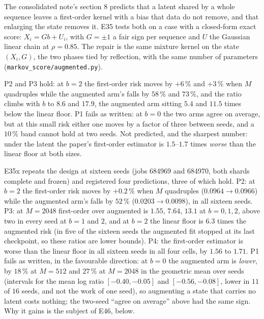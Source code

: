 \documentclass[10pt,a4paper]{article}
\newcommand{\code}[1]{\texttt{\small #1}}
\theoremstyle{plain}
\theoremstyle{remark}
\begin{document}
The consolidated note's section 8 predicts that a latent shared by a whole sequence leaves a first-order
kernel with a bias that data do not remove, and that enlarging the state removes it. E35 tests both on a
case with a closed-form exact score: $X_i=Gb+U_i$, with $G=\pm1$ a fair sign per sequence and $U$ the
Gaussian linear chain at $\rho=0.85$. The repair is the same mixture kernel on the state $(X_i,G)$, the two
phases tied by reflection, with the same number of parameters (\code{markov\_score/augmented.py}).

\begin{table}[h]\centering\footnotesize
\caption{E35, score risk against the closed-form exact score (seed 0 / seed 1). The linear floor is the
LMMSE of the true covariance $b^2\mathbf 1\mathbf 1^\top+\Sigma_U$; at $b=0$ it is the exact score.}
\label{tab:conf-e35}

\end{table}

P2 and P3 hold: at $b=2$ the first-order risk moves by $+6\,\%$ and $+3\,\%$ when $M$ quadruples while
the augmented arm's falls by $58\,\%$ and $73\,\%$, and the ratio climbs with $b$ to $8.6$ and $17.9$,
the augmented arm sitting $5.4$ and $11.5$ times below the linear floor. P1 fails as written: at $b=0$ the
two arms agree on average, but at this small risk either one moves by a factor of three between seeds, and
a $10\,\%$ band cannot hold at two seeds. Not predicted, and the sharpest number: under the latent the
paper's first-order estimator is $1.5$--$1.7$ times \emph{worse} than the linear floor at both sizes.

E35x repeats the design at sixteen seeds (jobs 684969 and 684970, both shards complete and frozen) and registered
four predictions, three of which hold. P2: at $b=2$ the first-order risk moves by $+0.2\,\%$ when $M$ quadruples
($0.0964\to0.0966$) while the augmented arm's falls by $52\,\%$ ($0.0203\to0.0098$), in all sixteen seeds. P3: at
$M=2048$ first-order over augmented is $1.55$, $7.64$, $13.1$ at $b=0,1,2$, above two in every seed at $b=1$ and $2$,
and at $b=2$ the linear floor is $6.3$ times the augmented risk (in five of the sixteen seeds the augmented fit
stopped at its last checkpoint, so these ratios are lower bounds). P4: the first-order estimator is worse than the
linear floor in all sixteen seeds in all four cells, by $1.56$ to $1.71$. P1 fails as written, in the favourable
direction: at $b=0$ the augmented arm is \emph{lower}, by $18\,\%$ at $M=512$ and $27\,\%$ at $M=2048$ in the
geometric mean over seeds (intervals for the mean log ratio $[-0.40,-0.05]$ and $[-0.56,-0.08]$, lower in $11$ of $16$
seeds, and not the work of one seed), so augmenting a state that carries no latent costs nothing; the two-seed
``agree on average'' above had the same sign. Why it gains is the subject of E46, below.
\end{document}
